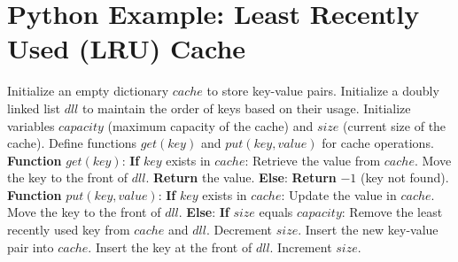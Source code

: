 \documentclass[12pt]{book} %
\begin{document}
\FloatBarrier
\section*{Python Example: Least Recently Used (LRU) Cache}
\begin{algorithm}
\caption{LRU Cache}
\begin{algorithmic}[1]
\State Initialize an empty dictionary $cache$ to store key-value pairs.
\State Initialize a doubly linked list $dll$ to maintain the order of keys based on their usage.
\State Initialize variables $capacity$ (maximum capacity of the cache) and $size$ (current size of the cache).
\State Define functions $get(key)$ and $put(key, value)$ for cache operations.
\State \textbf{Function} $get(key)$:
    \State \hspace{\algorithmicindent} \textbf{If} $key$ exists in $cache$:
        \State \hspace{\algorithmicindent} Retrieve the value from $cache$.
        \State \hspace{\algorithmicindent} Move the key to the front of $dll$.
        \State \hspace{\algorithmicindent} \textbf{Return} the value.
    \State \hspace{\algorithmicindent} \textbf{Else}:
        \State \hspace{\algorithmicindent} \textbf{Return} $-1$ (key not found).
\State \textbf{Function} $put(key, value)$:
    \State \hspace{\algorithmicindent} \textbf{If} $key$ exists in $cache$:
        \State \hspace{\algorithmicindent} Update the value in $cache$.
        \State \hspace{\algorithmicindent} Move the key to the front of $dll$.
    \State \hspace{\algorithmicindent} \textbf{Else}:
        \State \hspace{\algorithmicindent} \textbf{If} $size$ equals $capacity$:
            \State \hspace{\algorithmicindent} Remove the least recently used key from $cache$ and $dll$.
            \State \hspace{\algorithmicindent} Decrement $size$.
        \State \hspace{\algorithmicindent} Insert the new key-value pair into $cache$.
        \State \hspace{\algorithmicindent} Insert the key at the front of $dll$.
        \State \hspace{\algorithmicindent} Increment $size$.
\end{algorithmic}
\end{algorithm}
\FloatBarrier
\end{document}
